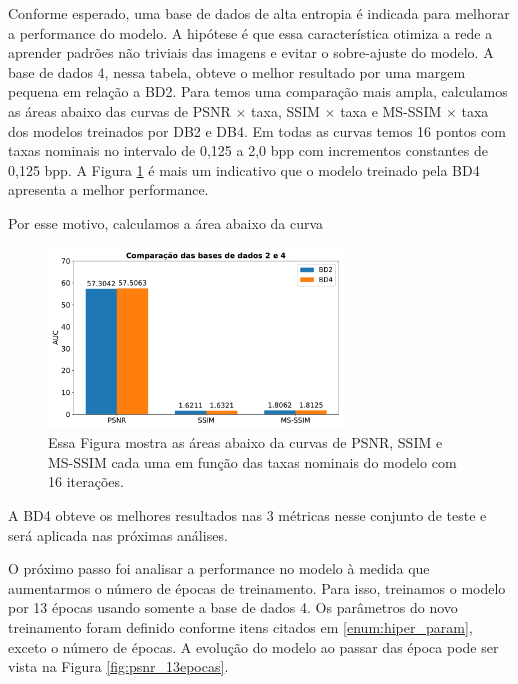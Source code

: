 Conforme esperado, uma base de dados de alta entropia é indicada para melhorar a performance do modelo. A hipótese é que essa característica otimiza a rede a aprender padrões não triviais das imagens e evitar o sobre-ajuste do modelo. A base de dados 4, nessa tabela, obteve o melhor resultado por uma margem pequena em relação a BD2. 
Para temos uma comparação mais ampla, calculamos as áreas abaixo das curvas de PSNR $\times$ taxa, SSIM $\times$ taxa e  MS-SSIM $\times$ taxa dos modelos treinados por DB2 e DB4. Em todas as curvas temos 16 pontos com taxas nominais no intervalo de 0,125 a 2,0 bpp com incrementos constantes de 0,125 bpp. A Figura \ref{fig:auc1} é mais um indicativo que o modelo treinado pela BD4 apresenta a melhor performance.    


Por esse motivo, calculamos a área abaixo da curva   

\begin{figure}
	\centering
	\includegraphics[width=0.7\textwidth]{figuras/auc1.pdf}
	\caption[Comparação das bases de dados pela área abaixo das curvas em métricas de qualidade]{Essa Figura mostra as áreas abaixo da curvas de PSNR, SSIM e MS-SSIM cada uma em função das taxas nominais do modelo com 16 iterações.}
	\label{fig:auc1}
\end{figure}

A BD4 obteve os melhores resultados nas 3 métricas nesse conjunto de teste e será aplicada nas próximas análises.

O próximo passo foi analisar a performance no modelo à medida que aumentarmos o número de épocas de treinamento.
Para isso, treinamos o modelo por 13 épocas usando somente a base de dados 4. Os parâmetros do novo treinamento foram definido conforme itens citados em \ref{enum:hiper_param}, exceto o número de épocas. A evolução do modelo ao passar das época pode ser vista na Figura \ref{fig:psnr_13epocas}. 

